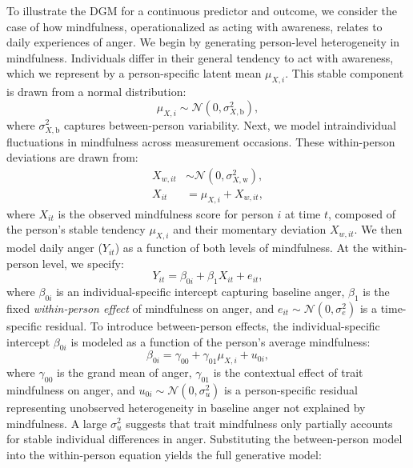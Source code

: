 \documentclass[stu]{apa7}
\begin{document}
To illustrate the DGM for a continuous predictor and outcome, we consider the case of how mindfulness, operationalized as acting with awareness, relates to daily experiences of anger. We begin by generating person-level heterogeneity in mindfulness. Individuals differ in their general tendency to act with awareness, which we represent by a person-specific latent mean \( \mu_{X,i} \). This stable component is drawn from a normal distribution:
\begin{equation}
    \label{eqn:xbetweencontxy}
    \mu_{X,i} \sim \mathcal{N}(0, \sigma^2_{X,\text{b}}),
\end{equation}
where \( \sigma^2_{X,\text{b}} \) captures between-person variability. Next, we model intraindividual fluctuations in mindfulness across measurement occasions. These within-person deviations are drawn from:
\begin{align}
    \label{eqn:xwithincontxy}
    X_{w,it} &\sim \mathcal{N}(0, \sigma^2_{X,\text{w}}), \\
    \label{eqn:relationwithinmundlak}
    X_{it} &= \mu_{X,i} + X_{w,it},
\end{align}
where \( X_{it} \) is the observed mindfulness score for person \( i \) at time \( t \), composed of the person’s stable tendency \( \mu_{X,i} \) and their momentary deviation \( X_{w,it} \). We then model daily anger (\( Y_{it} \)) as a function of both levels of mindfulness. At the within-person level, we specify:
\begin{equation}
    \label{eqn:yit-generationmlm}
    Y_{it} = \beta_{0i} + \beta_{1} X_{it} + e_{it},
\end{equation}
where \( \beta_{0i} \) is an individual-specific intercept capturing baseline anger, \( \beta_1 \) is the fixed \textit{within-person effect} of mindfulness on anger, and \( e_{it} \sim \mathcal{N}(0, \sigma^2_e) \) is a time-specific residual. To introduce between-person effects, the individual-specific intercept \( \beta_{0i} \) is modeled as a function of the person’s average mindfulness:
\begin{equation}
    \label{eqn:beta0-generationcontxy}
    \beta_{0i} = \gamma_{00} + \gamma_{01} \mu_{X,i} + u_{0i},
\end{equation}
where \( \gamma_{00} \) is the grand mean of anger, \( \gamma_{01} \) is the contextual effect of trait mindfulness on anger, and \( u_{0i} \sim \mathcal{N}(0, \sigma^2_u) \) is a person-specific residual representing unobserved heterogeneity in baseline anger not explained by mindfulness. A large \( \sigma^2_u \) suggests that trait mindfulness only partially accounts for stable individual differences in anger. Substituting the between-person model into the within-person equation yields the full generative model:
\end{document}
